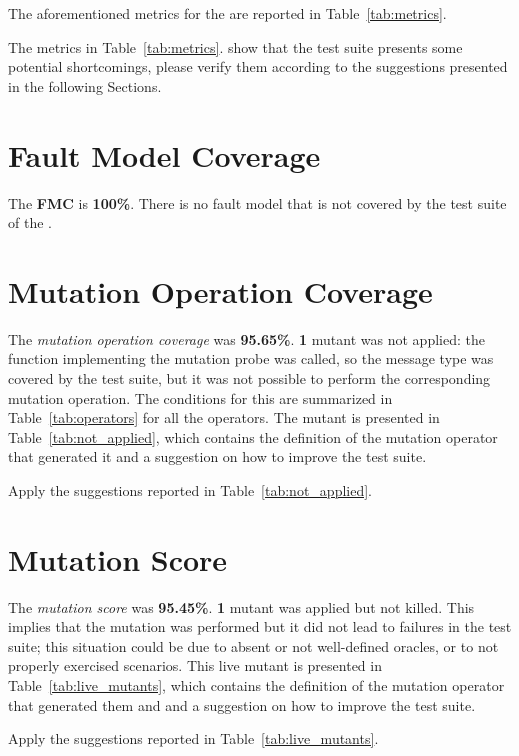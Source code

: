 The aforementioned metrics for the \case are reported in Table~\ref{tab:metrics}.





\action The metrics in Table~\ref{tab:metrics}. show that the test suite presents some potential shortcomings, please verify them according to the suggestions presented in the following Sections.

\section{Fault Model Coverage}

The \textbf{FMC} is \textbf{100\%}. There is no fault model that is not covered by the test suite of the \case.

\section{Mutation Operation Coverage}

The \emph{mutation operation coverage} was \textbf{95.65\%}. \textbf{1} mutant was not applied: the function implementing the mutation probe was called, so the message type was covered by the test suite, but it was not possible to perform the corresponding mutation operation.
The conditions for this are summarized in Table~\ref{tab:operators} for all the operators.
The mutant is presented in Table~\ref{tab:not_applied}, which contains the definition of the mutation operator that generated it and a suggestion on how to improve the test suite.

\action Apply the suggestions reported in Table~\ref{tab:not_applied}.

 


\section{Mutation Score}

 The \emph{mutation score} was \textbf{95.45\%}. \textbf{1} mutant was applied but not killed. This implies that the mutation was performed but it did not lead to failures in the test suite; this situation could be due to absent or not well-defined oracles, or to not properly exercised scenarios.
 This live mutant is presented in Table~\ref{tab:live_mutants}, which contains the definition of the mutation operator that generated them and and a suggestion on how to improve the test suite.

\action Apply the suggestions reported in Table~\ref{tab:live_mutants}.


